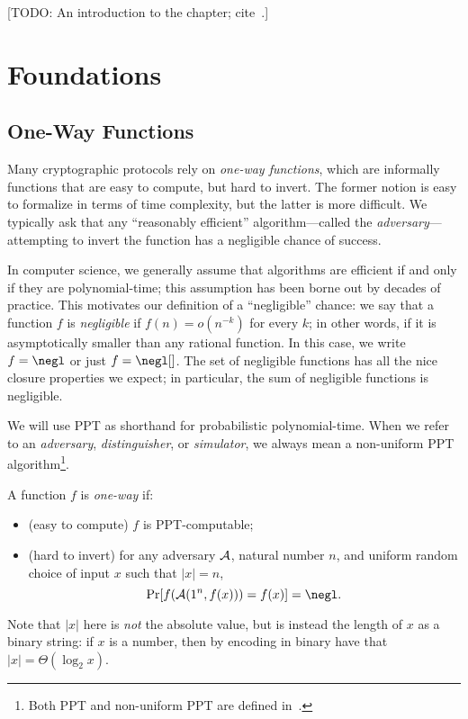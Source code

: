 [TODO: An introduction to the chapter;
cite~\cite{katz-lindell-2014, pass-shelat-2020, rosulek-2021}.]

\section{Foundations}

\subsection{One-Way Functions}

Many cryptographic protocols rely on \emph{one-way functions}, which are
informally functions that are easy to compute, but hard to invert. The former
notion is easy to formalize in terms of time complexity, but the latter is more
difficult. We typically ask that any ``reasonably efficient'' algorithm---called
the \emph{adversary}---attempting to invert the function has a negligible chance
of success.

In computer science, we generally assume that algorithms are efficient if and
only if they are polynomial-time; this assumption has been borne out by decades
of practice. This motivates our definition of a ``negligible'' chance: we say
that a function $f$ is \emph{negligible} if $f(n) = o(n^{-k})$
for every $k$; in other words, if it is asymptotically smaller than any rational
function. In this case, we write $f = \negl$ or just $f = \negl[]$. The set
of negligible functions has all the nice closure properties we expect; in
particular, the sum of negligible functions is negligible.


\begin{ntn}
  We will use PPT as shorthand for probabilistic polynomial-time. When we refer
  to an \emph{adversary}, \emph{distinguisher}, or \emph{simulator}, we always
  mean a non-uniform PPT algorithm\footnote{Both PPT and non-uniform PPT are defined
  in~.}.
\end{ntn}

\begin{dfn}\label{def:one-way function}
  A function $f$ is \emph{one-way} if:
  \begin{itemize}
    \item (easy to compute) $f$ is PPT-computable;
    \item (hard to invert) for any adversary $\mathcal{A}$, natural number $n$, and
      uniform random choice of input $x$ such that $|x| = n$, \[
        \Pr[f(\cA(1^n, f(x))) = f(x)] = \negl.
      \]
  \end{itemize}
  Note that $|x|$ here is \emph{not} the absolute value, but is instead the
  length of $x$ as a binary string: if $x$ is a number, then by encoding in
  binary have that $|x| = \Theta(\log_2 x)$.
\end{dfn}

